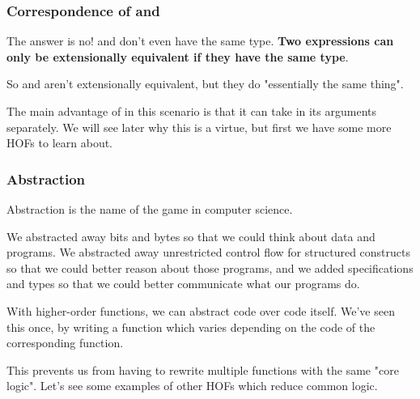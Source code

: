 \documentclass[aspectratio=169]{beamer}
\begin{document}
\begin{frame}[fragile]
  \frametitle{Correspondence of  and }

  The answer is no!  and  don't even have the same type.
  \textbf{Two expressions can only be extensionally equivalent if they have the same type}.

  \pause
  \vspace{\fill}

  So  and  aren't extensionally equivalent, but they do
  "essentially the same thing".

  \pause
  \vspace{\fill}

  The main advantage of  in this scenario is that it can take in its
  arguments separately. We will see later why this is a virtue, but first we have
  some more HOFs to learn about.
\end{frame}



\begin{frame}[fragile]
  \frametitle{Abstraction}

  Abstraction is the name of the game in computer science.

  \pause
  \vspace{\fill}

  We abstracted away bits and bytes so that we could think about data and programs.
  We abstracted away unrestricted control flow for structured constructs so that
  we could better reason about those programs, and we added specifications and types
  so that we could better communicate what our programs do.

  \pause
  \vspace{\fill}

  With higher-order functions, we can abstract code over code itself. We've seen this
  once, by writing a  function which varies depending on the code of the
  corresponding  function.

  \pause
  \vspace{\fill}

  This prevents us from having to rewrite multiple  functions with the
  same "core logic". Let's see some examples of other HOFs which reduce common logic.
\end{frame}
\end{document}
